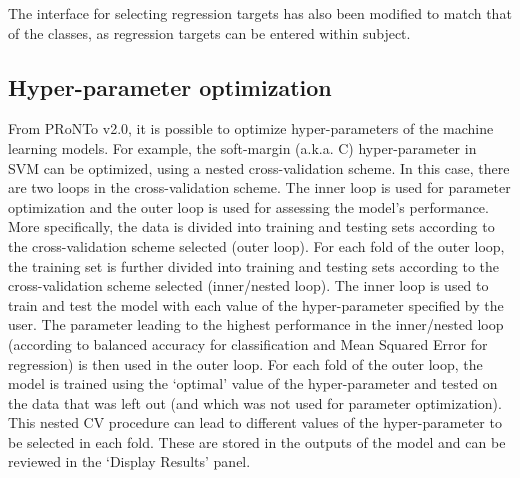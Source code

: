 The interface for selecting regression targets has also been modified to match that of the classes, as regression targets can be entered within subject.
\\



\subsection{Hyper-parameter optimization}

From PRoNTo v2.0, it is possible to optimize hyper-parameters of the machine learning models. For example, the soft-margin (a.k.a. C) hyper-parameter in SVM can be optimized, using a nested cross-validation scheme. In this case, there are two loops in the cross-validation scheme. The inner loop is used for parameter optimization and the outer loop is used for assessing the model's performance. More specifically, the data is divided into training and testing sets according to the cross-validation scheme selected (outer loop). For each fold of the outer loop, the training set is further divided into training and testing sets according to the cross-validation scheme selected (inner/nested loop). The inner loop is used to train and test the model with each value of the hyper-parameter specified by the user. The parameter leading to the highest performance in the inner/nested loop (according to balanced accuracy for classification and Mean Squared Error for regression) is then used in the outer loop. For each fold of the outer loop, the model is trained using the `optimal' value of the hyper-parameter and tested on the data that was left out (and which was not used for parameter optimization). This nested CV procedure can lead to different values of the hyper-parameter to be selected in each fold. These are stored in the outputs of the model and can be reviewed in the `Display Results' panel.
\\

